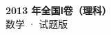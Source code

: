 \documentclass[zihao=-4, a4paper]{ctexart}
\begin{document}
\begin{center}
  {\Large\bfseries 2013 年全国Ⅰ卷（理科）}\\[4pt]
  {\large 数学 · 试题版}
\end{center}
\medskip
{}

\end{document}
